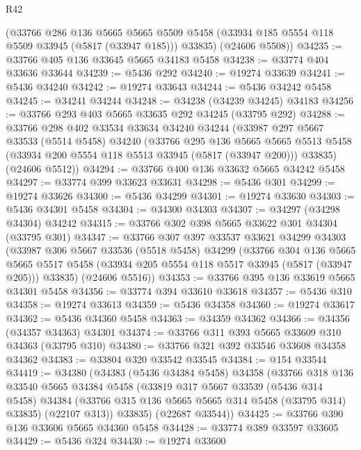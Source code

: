 \begin{lexlean}{R42}
\begin{coremodule}
      (@33766
        @286
        @136
        @5665
        @5665
        @5509
        @5458
        (@33934 @185 @5554 @118 @5509 @33945 (@5817 (@33947 @185)))
        @33835)
      (@24606 @5508))
@34235 := @33766 @405 @136 @33645 @5665 @34183 @5458
@34238 := @33774 @404 @33636 @33644
@34239 := @5436 @292
@34240 := @19274 @33639
@34241 := @5436 @34240
@34242 := @19274 @33643
@34244 := @5436 @34242 @5458
@34245 := @34241 @34244
@34248 := @34238 (@34239 @34245) @34183
@34256 := @33766 @293 @403 @5665 @33635 @292 @34245 (@33795 @292)
@34288 := @33766
    @298
    @402
    @33534
    @33634
    @34240
    @34244
    (@33987
      @297
      @5667
      @33533
      (@5514 @5458)
      @34240
      (@33766
        @295
        @136
        @5665
        @5665
        @5513
        @5458
        (@33934 @200 @5554 @118 @5513 @33945 (@5817 (@33947 @200)))
        @33835)
      (@24606 @5512))
@34294 := @33766 @400 @136 @33632 @5665 @34242 @5458
@34297 := @33774 @399 @33623 @33631
@34298 := @5436 @301
@34299 := @19274 @33626
@34300 := @5436 @34299
@34301 := @19274 @33630
@34303 := @5436 @34301 @5458
@34304 := @34300 @34303
@34307 := @34297 (@34298 @34304) @34242
@34315 := @33766 @302 @398 @5665 @33622 @301 @34304 (@33795 @301)
@34347 := @33766
    @307
    @397
    @33537
    @33621
    @34299
    @34303
    (@33987
      @306
      @5667
      @33536
      (@5518 @5458)
      @34299
      (@33766
        @304
        @136
        @5665
        @5665
        @5517
        @5458
        (@33934 @205 @5554 @118 @5517 @33945 (@5817 (@33947 @205)))
        @33835)
      (@24606 @5516))
@34353 := @33766 @395 @136 @33619 @5665 @34301 @5458
@34356 := @33774 @394 @33610 @33618
@34357 := @5436 @310
@34358 := @19274 @33613
@34359 := @5436 @34358
@34360 := @19274 @33617
@34362 := @5436 @34360 @5458
@34363 := @34359 @34362
@34366 := @34356 (@34357 @34363) @34301
@34374 := @33766 @311 @393 @5665 @33609 @310 @34363 (@33795 @310)
@34380 := @33766 @321 @392 @33546 @33608 @34358 @34362
@34383 := @33804 @320 @33542 @33545
@34384 := @154 @33544
@34419 := @34380
    (@34383
      (@5436 @34384 @5458)
      @34358
      (@33766
        @318
        @136
        @33540
        @5665
        @34384
        @5458
        (@33819
          @317
          @5667
          @33539
          (@5436 @314 @5458)
          @34384
          (@33766 @315 @136 @5665 @5665 @314 @5458 (@33795 @314) @33835)
          (@22107 @313))
        @33835)
      (@22687 @33544))
@34425 := @33766 @390 @136 @33606 @5665 @34360 @5458
@34428 := @33774 @389 @33597 @33605
@34429 := @5436 @324
@34430 := @19274 @33600

\end{coremodule}
\end{lexlean}
